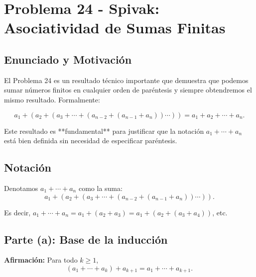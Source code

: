 
\section*{Problema 24 - Spivak: Asociatividad de Sumas Finitas}

\subsection*{Enunciado y Motivación}

El Problema 24 es un resultado técnico importante que demuestra que podemos sumar números finitos en cualquier orden de paréntesis y siempre obtendremos el mismo resultado. Formalmente:

\[
a_1 + (a_2 + (a_3 + \cdots + (a_{n-2} + (a_{n-1} + a_n)) \cdots )) = a_1 + a_2 + \cdots + a_n.
\]

Este resultado es **fundamental** para justificar que la notación $a_1 + \cdots + a_n$ está bien definida sin necesidad de especificar paréntesis.

\subsection*{Notación}

Denotamos $a_1 + \cdots + a_n$ como la suma:
\[
a_1 + (a_2 + (a_3 + \cdots + (a_{n-2} + (a_{n-1} + a_n)) \cdots )).
\]

Es decir, $a_1 + \cdots + a_n = a_1 + (a_2 + a_3) = a_1 + (a_2 + (a_3 + a_4))$, etc.

\subsection*{Parte (a): Base de la inducción}

\textbf{Afirmación:} Para todo $k \geq 1$,
\[
(a_1 + \cdots + a_k) + a_{k+1} = a_1 + \cdots + a_{k+1}.
\]

